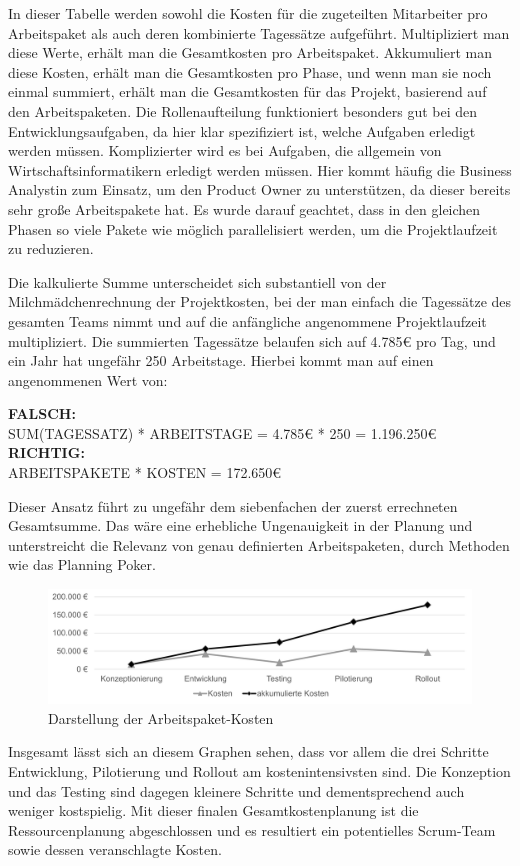 In dieser Tabelle werden sowohl die Kosten für die zugeteilten Mitarbeiter pro Arbeitspaket als auch deren kombinierte Tagessätze aufgeführt. Multipliziert man diese Werte, erhält man die Gesamtkosten pro Arbeitspaket. Akkumuliert man diese Kosten, erhält man die Gesamtkosten pro Phase, und wenn man sie noch einmal summiert, erhält man die Gesamtkosten für das Projekt, basierend auf den Arbeitspaketen. Die Rollenaufteilung funktioniert besonders gut bei den Entwicklungsaufgaben, da hier klar spezifiziert ist, welche Aufgaben erledigt werden müssen. Komplizierter wird es bei Aufgaben, die allgemein von Wirtschaftsinformatikern erledigt werden müssen. Hier kommt häufig die Business Analystin zum Einsatz, um den Product Owner zu unterstützen, da dieser bereits sehr große Arbeitspakete hat. Es wurde darauf geachtet, dass in den gleichen Phasen so viele Pakete wie möglich parallelisiert werden, um die Projektlaufzeit zu reduzieren.

Die kalkulierte Summe unterscheidet sich substantiell von der Milchmädchenrechnung der Projektkosten, bei der man einfach die Tagessätze des gesamten Teams nimmt und auf die anfängliche angenommene Projektlaufzeit multipliziert. Die summierten Tagessätze belaufen sich auf 4.785€ pro Tag, und ein Jahr hat ungefähr 250 Arbeitstage. Hierbei kommt man auf einen angenommenen Wert von:
\begin{center}
\textbf{FALSCH:}\\
SUM(TAGESSATZ) * ARBEITSTAGE = 4.785€ * 250 = 1.196.250€\\
\textbf{RICHTIG:}\\
ARBEITSPAKETE * KOSTEN = 172.650€\\
\end{center}
Dieser Ansatz führt zu ungefähr dem siebenfachen der zuerst errechneten Gesamtsumme. Das wäre eine erhebliche Ungenauigkeit in der Planung und unterstreicht die Relevanz von genau definierten Arbeitspaketen, durch Methoden wie das Planning Poker. 

\begin{figure}[h]
\centering
\includegraphics[scale=.2]{img/COST.pdf}
\captionsetup{format=hang}
\caption{\label{fig:COST}Darstellung der Arbeitspaket-Kosten}
\end{figure}

Insgesamt lässt sich an diesem Graphen sehen, dass vor allem die drei Schritte Entwicklung, Pilotierung und Rollout am kostenintensivsten sind. Die Konzeption und das Testing sind dagegen kleinere Schritte und dementsprechend auch weniger kostspielig. Mit dieser finalen Gesamtkostenplanung ist die Ressourcenplanung abgeschlossen und es resultiert ein potentielles Scrum-Team sowie dessen veranschlagte Kosten.